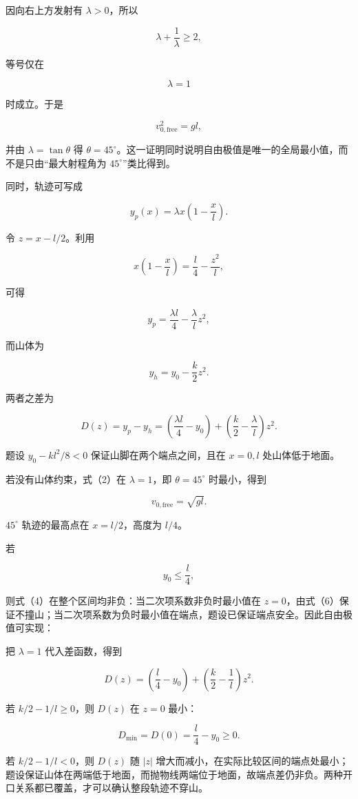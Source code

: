 \documentclass[12pt,a4paper,UTF8]{ctexart}
\begin{document}
因向右上方发射有 \(\lambda>0\)，所以

\[\lambda+\frac1\lambda\geq2,\]

等号仅在

\[\lambda=1\]

时成立。于是

\[v_{0,\mathrm{free}}^2=gl,\]

并由 \(\lambda=\tan\theta\) 得
\(\theta=45^\circ\)。这一证明同时说明自由极值是唯一的全局最小值，而不是只由``最大射程角为
\(45^\circ\)''类比得到。

同时，轨迹可写成

\[y_p(x)=\lambda x\left(1-\frac{x}{l}\right). \tag{3}\]

令 \(z=x-l/2\)。利用

\[x\left(1-\frac{x}{l}\right)=\frac l4-\frac{z^2}{l},\]

可得

\[y_p=\frac{\lambda l}{4}-\frac{\lambda}{l}z^2,\]

而山体为

\[y_h=y_0-\frac{k}{2}z^2.\]

两者之差为

\[D(z)=y_p-y_h
=\left(\frac{\lambda l}{4}-y_0\right)
+\left(\frac k2-\frac\lambda l\right)z^2. \tag{4}\]

题设 \(y_0-kl^2/8<0\) 保证山脚在两个端点之间，且在 \(x=0,l\)
处山体低于地面。

若没有山体约束，式（2）在 \(\lambda=1\)，即 \(\theta=45^\circ\)
时最小，得到

\[v_{0,\mathrm{free}}=\sqrt{gl}. \tag{5}\]

\(45^\circ\) 轨迹的最高点在 \(x=l/2\)，高度为 \(l/4\)。

若

\[y_0\leq\frac l4, \tag{6}\]

则式（4）在整个区间均非负：当二次项系数非负时最小值在
\(z=0\)，由式（6）保证不撞山；当二次项系数为负时最小值在端点，题设已保证端点安全。因此自由极值可实现：

把 \(\lambda=1\) 代入差函数，得到

\[D(z)=\left(\frac l4-y_0\right)
+\left(\frac k2-\frac1l\right)z^2.\]

若 \(k/2-1/l\geq0\)，则 \(D(z)\) 在 \(z=0\) 最小：

\[D_{\min}=D(0)=\frac l4-y_0\geq0.\]

若 \(k/2-1/l<0\)，则 \(D(z)\) 随 \(|z|\)
增大而减小，在实际比较区间的端点处最小；题设保证山体在两端低于地面，而抛物线两端位于地面，故端点差仍非负。两种开口关系都已覆盖，才可以确认整段轨迹不穿山。
\end{document}

